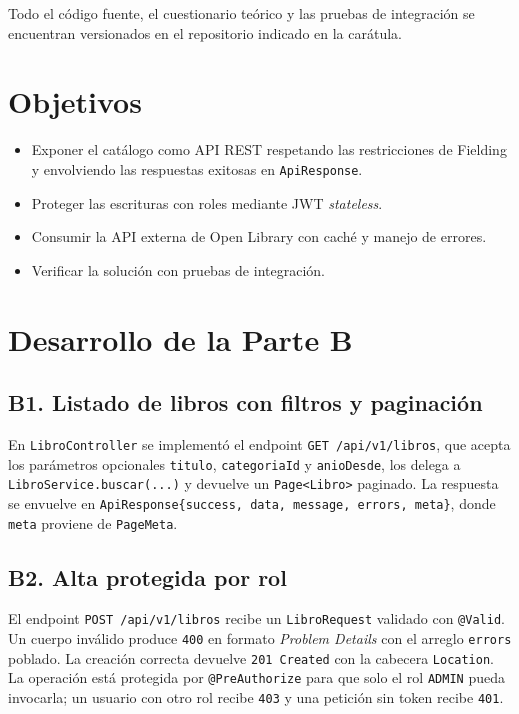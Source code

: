 \documentclass[11pt,a4paper]{article}
\begin{document}
Todo el código fuente, el cuestionario teórico y las pruebas de integración se
encuentran versionados en el repositorio indicado en la carátula.

\section{Objetivos}
\begin{itemize}
  \item Exponer el catálogo como API REST respetando las restricciones de
    Fielding y envolviendo las respuestas exitosas en \texttt{ApiResponse}.
  \item Proteger las escrituras con roles mediante JWT \emph{stateless}.
  \item Consumir la API externa de Open Library con caché y manejo de errores.
  \item Verificar la solución con pruebas de integración.
\end{itemize}

\section{Desarrollo de la Parte B}

\subsection{B1. Listado de libros con filtros y paginación}
En \texttt{LibroController} se implementó el endpoint
\texttt{GET /api/v1/libros}, que acepta los parámetros opcionales
\texttt{titulo}, \texttt{categoriaId} y \texttt{anioDesde}, los delega a
\texttt{LibroService.buscar(...)} y devuelve un \texttt{Page<Libro>} paginado.
La respuesta se envuelve en \texttt{ApiResponse\{success, data, message, errors,
meta\}}, donde \texttt{meta} proviene de \texttt{PageMeta}.

\subsection{B2. Alta protegida por rol}
El endpoint \texttt{POST /api/v1/libros} recibe un \texttt{LibroRequest}
validado con \texttt{@Valid}. Un cuerpo inválido produce \texttt{400} en
formato \emph{Problem Details} con el arreglo \texttt{errors} poblado. La
creación correcta devuelve \texttt{201 Created} con la cabecera
\texttt{Location}. La operación está protegida por \texttt{@PreAuthorize} para
que solo el rol \texttt{ADMIN} pueda invocarla; un usuario con otro rol recibe
\texttt{403} y una petición sin token recibe \texttt{401}.
\end{document}

